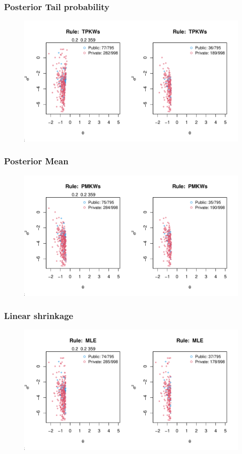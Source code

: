 \documentclass[10pt,mathserif]{beamer}
\begin{document}
\begin{frame}
  \frametitle{Posterior Tail probability}
  \begin{figure}
    \centering
    \includegraphics[width=\textwidth]{../../Figures/2013-2022/GMM/GLmix/Left_0.2_0.2_TPKWs.pdf}
  \end{figure}
\end{frame}

\begin{frame}
  \frametitle{Posterior Mean}
  \begin{figure}
    \centering
    \includegraphics[width=\textwidth]{../../Figures/2013-2022/GMM/GLmix/Left_0.2_0.2_PMKWs.pdf}
  \end{figure}
\end{frame}

\begin{frame}
  \frametitle{Linear shrinkage}
  \begin{figure}
    \centering
    \includegraphics[width=\textwidth]{../../Figures/2013-2022/GMM/GLmix/Left_0.2_0.2_MLE.pdf}
  \end{figure}
\end{frame}
\end{document}
